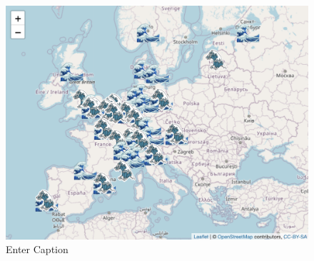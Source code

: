 \documentclass[a4paper, twoside, 12pt]{book}
\begin{document}
\begin{figure}
    \centering
    \includegraphics[width=1\linewidth]{sea ocean separate.png}
    \caption{Enter Caption}
    \label{fig:enter-label}
\end{figure}
\end{document}
